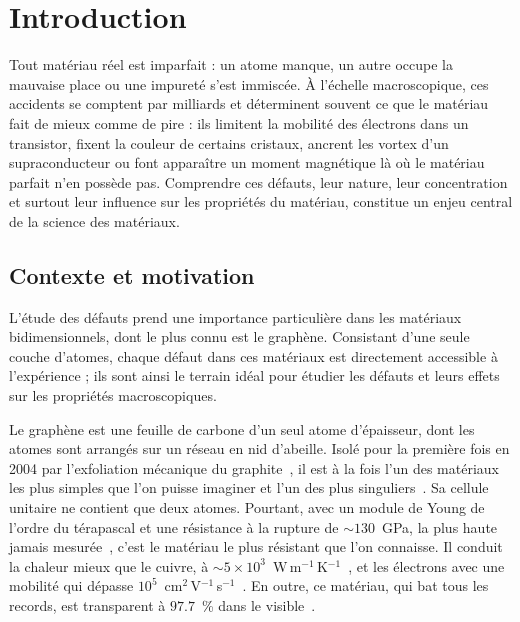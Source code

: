 \chapter{Introduction}\label{chap:introduction}

Tout matériau réel est imparfait : un atome manque, un autre occupe la mauvaise place ou une impureté s'est immiscée. À l'échelle macroscopique, ces accidents se comptent par milliards et déterminent souvent ce que le matériau fait de mieux comme de pire : ils limitent la mobilité des électrons dans un transistor, fixent la couleur de certains cristaux, ancrent les vortex d'un supraconducteur ou font apparaître un moment magnétique là où le matériau parfait n'en possède pas. Comprendre ces défauts, leur nature, leur concentration et surtout leur influence sur les propriétés du matériau, constitue un enjeu central de la science des matériaux.

\section{Contexte et motivation}
\label{sec:contexte}

L'étude des défauts prend une importance particulière dans les matériaux bidimensionnels, dont le plus connu est le graphène. Consistant d'une seule couche d'atomes, chaque défaut dans ces matériaux est directement accessible à l'expérience ; ils sont ainsi le terrain idéal pour étudier les défauts et leurs effets sur les propriétés macroscopiques.

\bigskip
{}

Le graphène est une feuille de carbone d'un seul atome d'épaisseur, dont les atomes sont arrangés sur un réseau en nid d'abeille. Isolé pour la première fois en 2004 par l'exfoliation mécanique du
graphite~\cite{novoselovElectricFieldEffect2004}, il est à la fois l'un des matériaux les plus simples que l'on puisse imaginer et l'un des plus singuliers~\cite{geimRiseGraphene2007}. Sa cellule unitaire ne contient que deux atomes. Pourtant, avec un module de Young de l'ordre du térapascal et une résistance à la rupture de $\sim 130$~GPa, la plus haute jamais mesurée~\cite{leeMeasurementElasticProperties2008}, c'est le matériau le plus résistant que l'on connaisse. Il conduit la chaleur mieux que le cuivre, à $\sim 5 \times 10^{3}$~W\,m$^{-1}$\,K$^{-1}$~\cite{balandinSuperiorThermalConductivity2008}, et les électrons avec une mobilité qui dépasse $10^{5}$~cm$^{2}$\,V$^{-1}$\,s$^{-1}$~\cite{bolotinUltrahighElectronMobility2008}. En outre, ce matériau, qui bat tous les records, est transparent à $97.7$~\% dans le visible~\cite{nairFineStructureConstant2008}.

